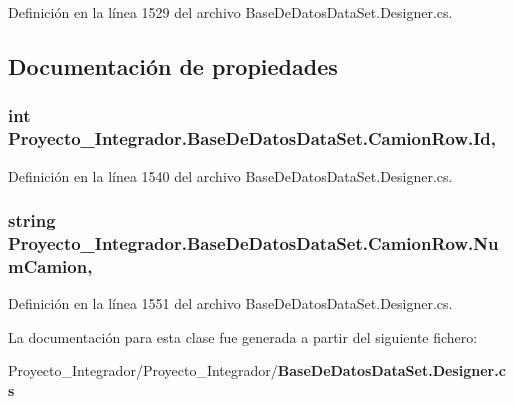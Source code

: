 Definición en la línea 1529 del archivo Base\-De\-Datos\-Data\-Set.\-Designer.\-cs.



\subsection{Documentación de propiedades}
\subsubsection[{Id}]{\setlength{\rightskip}{0pt plus 5cm}int Proyecto\-\_\-\-Integrador.\-Base\-De\-Datos\-Data\-Set.\-Camion\-Row.\-Id\hspace{0.3cm}{\ttfamily [get]}, {\ttfamily [set]}}\label{class_proyecto___integrador_1_1_base_de_datos_data_set_1_1_camion_row_a0d0f87dcaffb15c69c5d5412fb2a8d70}


Definición en la línea 1540 del archivo Base\-De\-Datos\-Data\-Set.\-Designer.\-cs.

\subsubsection[{Num\-Camion}]{\setlength{\rightskip}{0pt plus 5cm}string Proyecto\-\_\-\-Integrador.\-Base\-De\-Datos\-Data\-Set.\-Camion\-Row.\-Num\-Camion\hspace{0.3cm}{\ttfamily [get]}, {\ttfamily [set]}}\label{class_proyecto___integrador_1_1_base_de_datos_data_set_1_1_camion_row_a023cacc5945be2236ade0e6495764c83}


Definición en la línea 1551 del archivo Base\-De\-Datos\-Data\-Set.\-Designer.\-cs.



La documentación para esta clase fue generada a partir del siguiente fichero\-:\begin{DoxyCompactItemize}
\item 
Proyecto\-\_\-\-Integrador/\-Proyecto\-\_\-\-Integrador/{\bf Base\-De\-Datos\-Data\-Set.\-Designer.\-cs}\end{DoxyCompactItemize}
